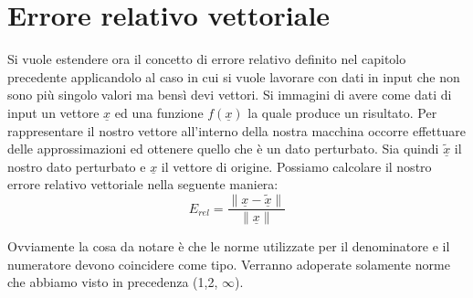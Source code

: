 \documentclass[12pt, a4paper]{book}
\theoremstyle{definition}
\newcommand{\VarMtrx}[1]{\ensuremath{\underline{#1}}}
\begin{document}
\section{Errore relativo vettoriale}
\begin{flushleft}
Si vuole estendere ora il concetto di errore relativo definito nel capitolo precedente applicandolo al caso in cui si vuole lavorare con dati in input che non sono più singolo valori ma bensì devi vettori. 
Si immagini di avere come dati di input un vettore \VarMtrx{x} ed una funzione $f(\VarMtrx{x})$ la quale produce un risultato. Per rappresentare il nostro vettore all'interno della nostra macchina occorre effettuare delle approssimazioni ed ottenere quello che  è un dato perturbato.
Sia quindi $\widetilde{\VarMtrx{x}}$ il nostro dato perturbato e  \VarMtrx{x} il vettore di origine. Possiamo calcolare il nostro errore relativo vettoriale nella seguente maniera: 
\[  E_{rel} = \frac{\lVert \VarMtrx{x} - \widetilde{\VarMtrx{x}}\rVert }{\lVert\VarMtrx{x}\rVert}\]

Ovviamente la cosa da notare  è che le norme utilizzate per il denominatore e il numeratore devono coincidere come tipo. Verranno adoperate solamente norme che abbiamo visto in precedenza (1,2,  $\infty$).
\end{flushleft}
\end{document}
